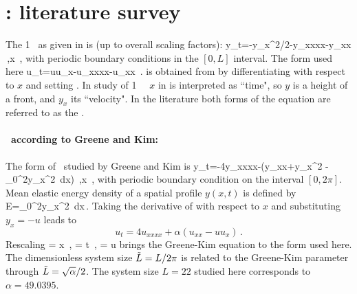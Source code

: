 
\section{\KS: literature survey}
\label{sec:KSlit}


%
The {1\dmn} \KSe\
as given in  is (up to overall scaling factors):
\beq
    y_t=-y_x^2/2-y_{xxxx}-y_{xx}
\,,\qquad       x \in [0,L]
\,,
    \label{eq:KSeOR}
\eeq
with periodic boundary conditions in the $[0,L]$ interval. The form used
here
\beq
    u_t=uu_x-u_{xxxx}-u_{xx}
\,.
    \label{eq:KSeAP}
\eeq
is obtained from  by differentiating with respect to $x$
and setting \PCedit{$u=-y_x$}.
In study of {1\dmn} \KS\ \eqva\ $x$ in 
is interpreted as ``time", so $y$ is a height of a front, and $y_x$ its ``velocity".
In the literature  both forms of the equation are
referred to as the \KSe.

\paragraph{\Eqva\ according to Greene and Kim:}
%
The form of \KSe\ studied by Greene and Kim is
\beq
    y_t=-4y_{xxxx}-\alpha\left(y_{xx}+y_x^2
            -\int_0^{2\pi}y_x^2\ dx\right)
\,,\qquad       x \in [0,2\pi]
\,,
    \label{eq:KSeGreeneKim}
\eeq
with  periodic boundary condition on the interval $[0,2\pi]$.
Mean elastic energy density of a spatial profile $y(x,t)$ is defined by
\beq
    E=\int_0^{2\pi}y_x^2\, dx\,.
    \label{KSenergy}
\eeq
Taking the derivative of 
with respect to $x$ and substituting $y_x=-u$ leads to
\[
    u_t=4u_{xxxx}+\alpha\left(u_{xx}-uu_x\right)
\,.
\]
Rescaling
\beq
    = x
\,,\qquad
    = t
\,,\qquad
    = u
    \label{eq:GKscale}
\eeq
brings the Greene-Kim equation to the form  used here.
The dimensionless system size $\tilde{L}=L/2\pi$ is related to
the Greene-Kim parameter
through $\tilde{L}=\sqrt{\alpha}/2$.
The system size $L=22$ studied here corresponds to $\alpha=49.0395$.

